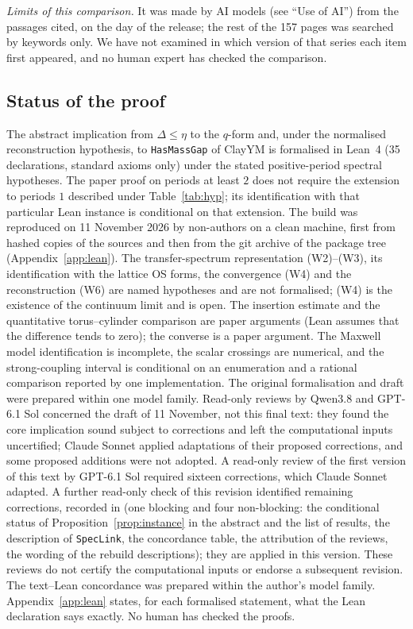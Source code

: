 \documentclass[11pt,a4paper]{article}
\theoremstyle{plain}
\theoremstyle{definition}
\theoremstyle{remark}
\numberwithin{equation}{section}
\begin{document}
\emph{Limits of this comparison.} It was made by AI models (see ``Use of AI'') from the passages cited, on the day of the release; the rest
of the 157 pages was searched by keywords only. We have not examined in which version of that series each item first appeared, and no human
expert has checked the comparison.

\subsection{Status of the proof}\label{sec:status}
The abstract implication from $\Delta\le\eta$ to the $q$-form and, under the normalised reconstruction hypothesis, to \texttt{HasMassGap}
of ClayYM is formalised in Lean~4 (35 declarations, standard axioms only) under the stated positive-period spectral hypotheses. The paper proof on periods at least $2$ does not require the extension to periods $1$ described under Table~\ref{tab:hyp}; its identification with that particular Lean instance is conditional on that extension. The build was reproduced on 11 November 2026 by non-authors on a
clean machine, first from hashed copies of the sources and then from the git archive of the package tree (Appendix~\ref{app:lean}). The transfer-spectrum representation
(W2)--(W3), its identification with the lattice OS forms, the convergence (W4) and the reconstruction (W6) are named hypotheses and are not
formalised; (W4) is the existence of the continuum limit and is open. The insertion estimate and the quantitative torus--cylinder comparison
are paper arguments (Lean assumes that the difference tends to zero); the converse is a paper argument. The Maxwell model identification is
incomplete, the scalar crossings are numerical, and the strong-coupling interval is conditional on an enumeration and a rational comparison reported by one implementation. The original formalisation and draft were prepared within one model family. Read-only reviews by Qwen3.8 and GPT-6.1 Sol concerned the draft of 11 November, not this final text: they found the core implication sound subject to corrections and left the computational inputs uncertified; Claude Sonnet applied adaptations of their proposed corrections, and some proposed additions were not adopted. A read-only review of the first version of this text by GPT-6.1 Sol required sixteen corrections, which Claude Sonnet adapted. A further read-only check of this revision identified remaining corrections, recorded in  (one blocking and four non-blocking: the conditional status of Proposition~\ref{prop:instance} in the abstract and the list of results, the description of \texttt{SpecLink}, the concordance table, the attribution of the reviews, the wording of the rebuild descriptions); they are applied in this version. These reviews do not certify the computational inputs or endorse a subsequent revision. The text--Lean concordance was prepared within the author's model family. Appendix~\ref{app:lean} states, for each formalised statement, what the Lean declaration says exactly. No human has checked the proofs.
\end{document}
